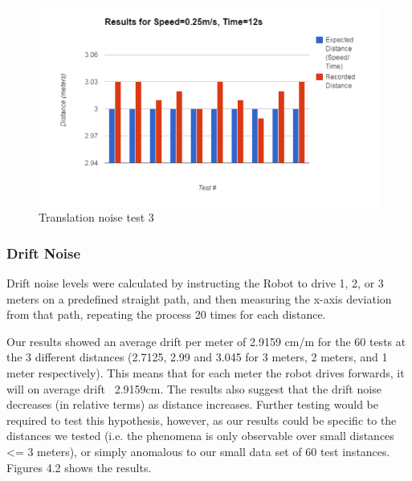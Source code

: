 \documentclass{article}
\begin{document}
\begin{multicols}{2}
\begin{figure}[H]
	\includegraphics[width=\linewidth]{ExperimentalResults3}
	\caption{Translation noise test 3}
	\end{figure}

	\newpage
	\subsubsection{Drift Noise}
	Drift noise levels were calculated by instructing the Robot to drive 1, 2, or 3 meters on a predefined straight path, and then measuring the x-axis deviation from that path, repeating the process 20 times for each distance.

Our results showed an average drift per meter of 2.9159 cm/m for the 60 tests at the 3 different distances (2.7125, 2.99 and 3.045 for 3 meters, 2 meters, and 1 meter respectively). This means that for each meter the robot drives forwards, it will on average drift ~2.9159cm. The results also suggest that the drift noise decreases (in relative terms) as distance increases. Further testing would be required to test this hypothesis, however, as our results could be specific to the distances we tested (i.e. the phenomena is only observable over small distances <= 3 meters), or simply anomalous to our small data set of 60 test instances. Figures 4.2 shows the results.
	

\end{multicols}
\end{document}
